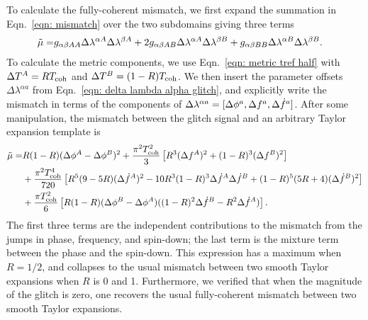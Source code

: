 \documentclass[../full_thesis/full_thesis.tex]{subfiles}
\begin{document}
To calculate the fully-coherent mismatch, we first expand
the summation in Eqn.~\eqref{eqn: mismatch} over the two subdomains giving three terms
\begin{align}
\begin{split}
\tilde{\mu} = &
g_{\alpha\beta AA}\Delta\lambda^{\alpha A} \Delta\lambda^{\beta A} +
2 g_{\alpha\beta AB}\Delta\lambda^{\alpha A} \Delta\lambda^{\beta B}
+ g_{\alpha\beta BB}\Delta\lambda^{\alpha B} \Delta\lambda^{\beta B}.
\end{split}
\end{align}
To calculate the metric components, we use Eqn.~\eqref{eqn: metric tref half}
with $\Delta T^A = RT_{\mathrm{coh}}$ and $\Delta T^B = (1-R)T_{\mathrm{coh}}$.
We then insert the parameter offsets $\Delta\lambda^{\alpha a}$
from Eqn.~\eqref{eqn: delta lambda alpha glitch},
and explicitly write the mismatch in terms of the components  of $\Delta\lambda^{\alpha a}=
[\Delta\phi^{a}, \Delta f^{a}, \Delta\dot{f}^{a}]$.
After some manipulation, the mismatch between the glitch signal and an arbitrary
Taylor expansion template is
\begin{align}
\begin{split}
\tilde{\mu} = & R(1-R)(\Delta\phi^A - \Delta\phi^B)^{2}
+ \frac{\pi^{2}T_{\mathrm{coh}}^{2}}{3}
\left[R^{3}(\Delta f^A)^{2} + (1-R)^{3}  (\Delta f^B)^{2}\right] \\
& + \frac{\pi^{2} T_{\mathrm{coh}}^{4}}{720}\left[
       R^{5}(9-5R)(\Delta\dot{f}^A)^{2}
       -10R^{3}(1-R)^{3}\Delta\dot{f}^A\Delta\dot{f}^B
       + (1-R)^{5}(5R+4)(\Delta\dot{f}^B)^{2}
                                       \right] \\
& + \frac{\pi T_{\mathrm{coh}}^{2}}{6}\left[R(1-R)
    (\Delta\phi^B - \Delta\phi^A)
    ((1-R)^{2}\Delta\dot{f}^B -  R^{2}\Delta\dot{f}^A)
                                 \right].
\end{split}
\label{eqn: mutilde fully-coherent unminimised}
\end{align}
The first three terms are the independent contributions to the mismatch from
the jumps in phase, frequency, and spin-down; the last term is the mixture term
between the phase and the spin-down.  This expression has a maximum when $R =
1/2$, and collapses to the usual mismatch between two smooth Taylor expansions when
$R$ is 0 and 1. Furthermore, we verified that when the magnitude of the glitch
is zero, one recovers the usual fully-coherent mismatch between two smooth
Taylor expansions.
\end{document}
